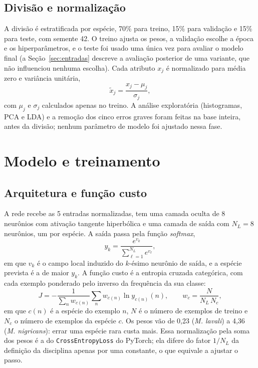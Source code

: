 \documentclass{sbrt}
\begin{document}
\subsection{Divisão e normalização}

A divisão é estratificada por espécie, 70\% para treino, 15\% para validação e 15\% para teste, com semente 42. O treino ajusta os pesos, a validação escolhe a época e os hiperparâmetros, e o teste foi usado uma única vez para avaliar o modelo final (a Seção~\ref{sec:entradas} descreve a avaliação posterior de uma variante, que não influenciou nenhuma escolha). Cada atributo $x_j$ é normalizado para média zero e variância unitária,
\begin{equation}
\tilde{x}_j=\frac{x_j-\mu_j}{\sigma_j},
\end{equation}
com $\mu_j$ e $\sigma_j$ calculados apenas no treino. A análise exploratória (histogramas, PCA e LDA) e a remoção dos cinco erros graves foram feitas na base inteira, antes da divisão; nenhum parâmetro de modelo foi ajustado nessa fase.

\section{Modelo e treinamento}

\subsection{Arquitetura e função custo}

A rede recebe as 5 entradas normalizadas, tem uma camada oculta de 8 neurônios com ativação tangente hiperbólica e uma camada de saída com $N_L=8$ neurônios, um por espécie. A saída passa pela função \textit{softmax},
\begin{equation}
y_k=\frac{e^{v_k}}{\sum_{\ell=1}^{N_L}e^{v_\ell}},
\end{equation}
em que $v_k$ é o campo local induzido do $k$-ésimo neurônio de saída, e a espécie prevista é a de maior $y_k$. A função custo é a entropia cruzada categórica, com cada exemplo ponderado pelo inverso da frequência da sua classe:
\begin{equation}
J=-\frac{1}{\sum_n w_{c(n)}}\sum_{n}w_{c(n)}\ln y_{c(n)}(n),\qquad w_c=\frac{N}{N_L\,N_c},
\end{equation}
em que $c(n)$ é a espécie do exemplo $n$, $N$ é o número de exemplos de treino e $N_c$ o número de exemplos da espécie $c$. Os pesos vão de 0,23 (\textit{M. lavali}) a 4,36 (\textit{M. nigricans}): errar uma espécie rara custa mais. Essa normalização pela soma dos pesos é a do \texttt{CrossEntropyLoss} do PyTorch; ela difere do fator $1/N_L$ da definição da disciplina apenas por uma constante, o que equivale a ajustar o passo.
\end{document}
